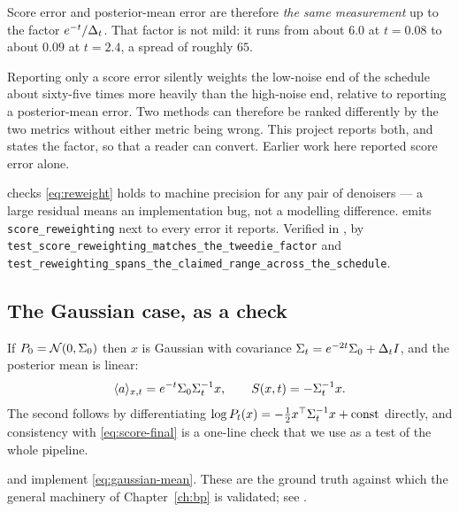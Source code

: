 Score error and posterior-mean error are therefore \emph{the same measurement} up to the
factor $e^{-t}/\Delta_t$. That factor is not mild: it runs from about $6.0$ at $t=0.08$ to about
$0.09$ at $t=2.4$, a spread of roughly $65$.

\begin{pitfall}
Reporting only a score error silently weights the low-noise end of the schedule about
sixty-five times more heavily than the high-noise end, relative to reporting a posterior-mean
error. Two methods can therefore be ranked differently by the two metrics without either
metric being wrong. This project reports both, and states the factor, so that a reader can
convert. Earlier work here reported score error alone.
\begin{codebox}
 checks \eqref{eq:reweight} holds to
machine precision for any pair of denoisers --- a large residual means an implementation bug,
not a modelling difference.  emits
\texttt{score\_reweighting} next to every error it reports.
Verified in , by
\texttt{test\_score\_reweighting\_matches\_the\_tweedie\_factor} and
\texttt{test\_reweighting\_spans\_the\_claimed\_range\_across\_the\_schedule}.
\end{codebox}
\end{pitfall}

\subsection{The Gaussian case, as a check}

If $P_0 = \mathcal{N}\!\left(0,\Sigma_0\right)$ then $x$ is Gaussian with covariance
$\Sigma_t = e^{-2t}\Sigma_0 + \Delta_t I$, and the posterior mean is linear:
\begin{equation}
\label{eq:gaussian-mean}
\langle a \rangle_{x,t} = e^{-t}\Sigma_0 \Sigma_t^{-1} x ,
\qquad
S(x,t) = -\Sigma_t^{-1}x .
\end{equation}
The second follows by differentiating $\log P_t(x) = -\tfrac12 x^\top\Sigma_t^{-1}x + \text{const}$
directly, and consistency with \eqref{eq:score-final} is a one-line check that we use as a
test of the whole pipeline.

\begin{codebox}
 and
 implement \eqref{eq:gaussian-mean}.
These are the ground truth against which the general machinery of Chapter~\ref{ch:bp} is
validated; see .
\end{codebox}

